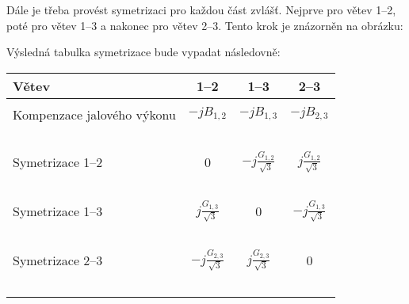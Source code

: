 \documentclass{article}
\begin{document}
Dále je třeba provést symetrizaci pro každou část zvlášť. Nejprve pro větev 1--2, poté pro větev 1--3 a nakonec pro větev 2--3. Tento krok je znázorněn na obrázku:
\begin{figure}[H]
    \centering
    \qquad
    \qquad
\end{figure}

Výsledná tabulka symetrizace bude vypadat následovně:
\begin{table}[H]
    \centering
    \begin{tabular}{l c c c}
        \hline
        Větev                      & 1--2                          & 1--3                          & 2--3                          \\
        \hline                                                                                                                     \\
        Kompenzace jalového výkonu & $-j B_{1,2}$                  & $-j B_{1,3}$                  & $-j B_{2,3}$                  \\~\\
        Symetrizace 1--2           & 0                             & $-j \frac{G_{1,2}}{\sqrt{3}}$ & $j \frac{G_{1,2}}{\sqrt{3}}$  \\~\\
        Symetrizace 1--3           & $j \frac{G_{1,3}}{\sqrt{3}}$  & 0                             & $-j \frac{G_{1,3}}{\sqrt{3}}$ \\~\\
        Symetrizace 2--3           & $-j \frac{G_{2,3}}{\sqrt{3}}$ & $j \frac{G_{2,3}}{\sqrt{3}}$  & 0                             \\~\\
        \hline
    \end{tabular}
\end{table}
\end{document}

